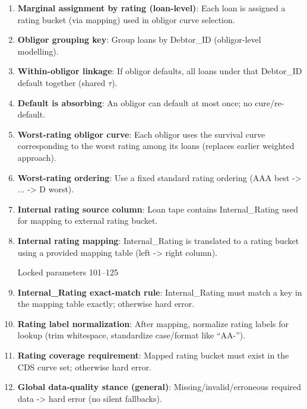 \documentclass[11pt]{article}
\begin{document}
\begin{enumerate}[label=\arabic*),leftmargin=*,align=left]
\item \textbf{Marginal assignment by rating (loan-level)}: Each loan is assigned a rating bucket (via mapping) used in obligor curve selection.

\item \textbf{Obligor grouping key}: Group loans by Debtor\_ID (obligor-level modelling).

\item \textbf{Within-obligor linkage}: If obligor defaults, all loans under that Debtor\_ID default together (shared $\tau$).

\item \textbf{Default is absorbing}: An obligor can default at most once; no cure/re-default.

\item \textbf{Worst-rating obligor curve}: Each obligor uses the survival curve corresponding to the worst rating among its loans (replaces earlier weighted approach).

\item \textbf{Worst-rating ordering}: Use a fixed standard rating ordering (AAA best -> ... -> D worst).

\item \textbf{Internal rating source column}: Loan tape contains Internal\_Rating used for mapping to external rating bucket.

\item \textbf{Internal rating mapping}: Internal\_Rating is translated to a rating bucket using a provided mapping table (left -> right column).

\vspace{1em}
\noindent Locked parameters 101–125
\vspace{0.5em}

\item \textbf{Internal\_Rating exact-match rule}: Internal\_Rating must match a key in the mapping table exactly; otherwise hard error.

\item \textbf{Rating label normalization}: After mapping, normalize rating labels for lookup (trim whitespace, standardize case/format like “AA-”).

\item \textbf{Rating coverage requirement}: Mapped rating bucket must exist in the CDS curve set; otherwise hard error.

\item \textbf{Global data-quality stance (general)}: Missing/invalid/erroneous required data -> hard error (no silent fallbacks).


\end{enumerate}
\end{document}
